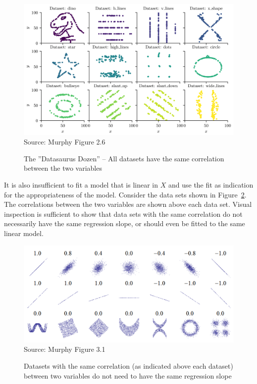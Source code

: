 \begin{figure}
\centering
\includegraphics[width=.85\textwidth]{screen1.png} \\

\scriptsize Source: Murphy Figure 2.6 \\ \vspace{3mm}
\normalsize
\caption[The ''Datasaurus Dozen'' data sets]{The ''Datasaurus Dozen'' -- All datasets have the same correlation between the two variables}
\label{fig:datasaurus}
\end{figure}

It is also insufficient to fit a model that is linear in $X$ and use the fit as indication for the appropriateness of the model. Consider the data sets shown in Figure~\ref{fig:murphy31}. The correlations between the two variables are shown above each data set. Visual inspection is sufficient to show that data sets with the same correlation do not necessarily have the same regression slope, or should even be fitted to the same linear model. 

\begin{figure}
\centering
\includegraphics[width=.9\textwidth]{screen2.png} \\

\scriptsize Source: Murphy Figure 3.1 \\ \vspace{3mm}
\normalsize
\caption[Correlation and regression slopes]{Datasets with the same correlation (as indicated above each dataset) between two variables do not need to have the same regression slope}
\label{fig:murphy31}
\end{figure}

